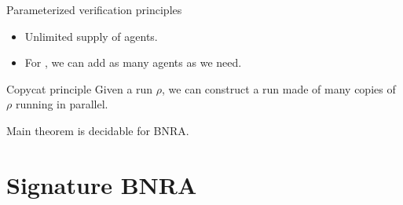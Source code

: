\documentclass{beamer}
\begin{document}
\begin{frame}{Parameterized verification principles}
	
	\begin{itemize}
		\item Unlimited supply of agents.
		
		\item For {}, we can add as many agents as we need. 
	\end{itemize}
	
	\pause
	
	\begin{block}{Copycat principle}
		Given a run $\rho$, we can construct a run made of many copies of $\rho$ running in parallel.
	\end{block}
	
	\pause
	
	\begin{block}{Main theorem}
		{} is decidable for BNRA.
	\end{block}
	
\end{frame}







\section{Signature BNRA}

\begin{frame}
	\tableofcontents[currentsection]
\end{frame}
\end{document}
